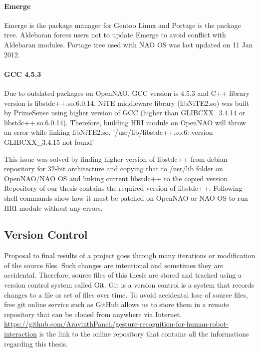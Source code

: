 \paragraph*{Emerge} Emerge is the package manager for Gentoo Linux and Portage is the package tree.  Aldebaran forces users not to update Emerge to avoid conflict with Aldebaran modules. Portage tree used with NAO OS was last updated on 11 Jan 2012. 

\paragraph*{GCC 4.5.3} Due to outdated packages on OpenNAO, GCC version is 4.5.3 and C++ library version is libstdc++.so.6.0.14. NiTE middleware library (libNiTE2.so) was built by PrimeSense using higher version of GCC (higher than GLIBCXX\_3.4.14 or libstdc++.so.6.0.14). Therefore, building HRI module on OpenNAO will throw an error while linking libNiTE2.so, '/usr/lib/libstdc++.so.6: version GLIBCXX\_3.4.15 not found'

This issue was solved by finding higher version of libstdc++ from debian repository for 32-bit architecture and copying that to /usr/lib folder on OpenNAO/NAO OS and linking current libstdc++ to the copied version. Repository of our thesis contains the required version of libstdc++. Following shell commands show how it must be patched on OpenNAO or NAO OS to run HRI module without any errors.



\subsection{Version Control} Proposal to final results of a project goes through many iterations or modification of the source files. Such changes are intentional and sometimes they are accidental. Therefore, source files of this thesis are stored and tracked using a version control system called Git. Git is a version control is a system that records changes to a file or set of files over time. To avoid accidental lose of source files, free git online service such as GitHub allows us to store them in a remote repository that can be cloned from anywhere via Internet. \url{https://github.com/AravinthPanch/gesture-recognition-for-human-robot-interaction} is the link to the online repository that contains all the informations regarding this thesis.

